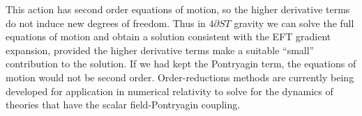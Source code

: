 \documentclass{ws-ijmpd}
\begin{document}
This action has second order equations of motion, so the higher derivative
terms do not induce new degrees of freedom.
Thus in $4\partial ST$ gravity we can solve the full equations of motion
and obtain a solution consistent with the EFT gradient expansion,
provided the higher derivative terms make a suitable ``small'' contribution
to the solution\cite{Kovacs:2020pns,Kovacs:2020ywu}.
If we had kept the Pontryagin term, the equations of motion
would not be second order\cite{Delsate:2014hba}.
Order-reductions methods are currently being developed for application
in numerical relativity to solve for the dynamics of theories that
have the scalar field-Pontryagin coupling\cite{Okounkova:2017yby,
Okounkova:2018abo,Okounkova:2018pql,GalvezGhersi:2021sxs
}.




\end{document}
